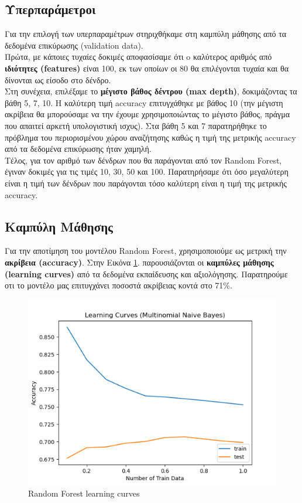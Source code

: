 \documentclass[12pt]{article}
\begin{document}
\subsection{Υπερπαράμετροι}
Για την επιλογή των υπερπαραμέτρων στηριχθήκαμε στη καμπύλη μάθησης από τα δεδομένα επικύρωσης (validation data).\\ 
Πρώτα, με κάποιες τυχαίες δοκιμές αποφασίσαμε ότι o καλύτερος αριθμός από \textbf{ιδιότητες (features)} είναι 100, εκ των οποίων οι 80 θα επιλέγονται τυχαία και θα δίνονται ως είσοδο στο δένδρο.\\
Στη συνέχεια, επιλέξαμε το \textbf{μέγιστο βάθος δέντρου (max depth)}, δοκιμάζοντας τα βάθη 5, 7, 10. Η καλύτερη τιμή accuracy επιτυγχάθηκε με βάθος 10 (την μέγιστη ακρίβεια θα μπορούσαμε να την έχουμε χρησιμοποιώντας το μέγιστο βάθος, πράγμα που απαιτεί αρκετή υπολογιστική ισχυς). Στα βάθη 5 και 7 παρατηρήθηκε το πρόβλημα του περιορισμένου χώρου αναζήτησης καθώς η τιμή της μετρικής accuracy από τα δεδομένα επικύρωσης ήταν χαμηλή.\\
Τέλος, για τον αριθμό των δένδρων που θα παράγονται από τον Random Forest, έγιναν δοκιμές για τις τιμές 10, 30, 50 και 100. Παρατηρήσαμε ότι όσο μεγαλύτερη είναι η τιμή των δένδρων που παράγονται τόσο καλύτερη είναι η τιμή της μετρικής accuracy.

\subsection{Καμπύλη Μάθησης}
Για την αποτίμηση του μοντέλου Random Forest, χρησιμοποιούμε ως μετρική την \textbf{ακρίβεια (accuracy)}. Στην Εικόνα \ref{fig:rf-learning-curves}. παρουσιάζονται οι \textbf{καμπύλες μάθησης (learning curves)} από τα δεδομένα εκπαίδευσης και αξιολόγησης. Παρατηρούμε οτι το μοντέλο μας επιτυγχάνει ποσοστά ακρίβειας κοντά στο 71\%.
\begin{figure}[H]
    \centering
    \includegraphics[scale=.8]{images/rf-learning-curve}
    \caption{Random Forest learning curves}
    \label{fig:rf-learning-curves}
 \end{figure}
\end{document}
